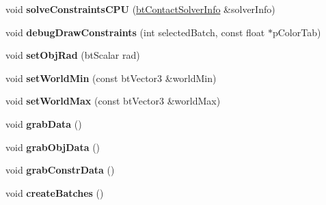 \begin{DoxyCompactItemize}
\item 
\hypertarget{classbt_cuda_demo_dynamics_world3_d_a84fa871068d7e73ffc571b9fa111b28d}{void {\bfseries solve\+Constraints\+C\+P\+U} (\hyperlink{structbt_contact_solver_info}{bt\+Contact\+Solver\+Info} \&solver\+Info)}\label{classbt_cuda_demo_dynamics_world3_d_a84fa871068d7e73ffc571b9fa111b28d}

\item 
\hypertarget{classbt_cuda_demo_dynamics_world3_d_a452fcd29c4582e80a683e573fe2eb6e0}{void {\bfseries debug\+Draw\+Constraints} (int selected\+Batch, const float $\ast$p\+Color\+Tab)}\label{classbt_cuda_demo_dynamics_world3_d_a452fcd29c4582e80a683e573fe2eb6e0}

\item 
\hypertarget{classbt_cuda_demo_dynamics_world3_d_a687eebcca42ddec28019d5b0d8bf0633}{void {\bfseries set\+Obj\+Rad} (bt\+Scalar rad)}\label{classbt_cuda_demo_dynamics_world3_d_a687eebcca42ddec28019d5b0d8bf0633}

\item 
\hypertarget{classbt_cuda_demo_dynamics_world3_d_a26c02058ac842cfb362cbda8eef0ddd2}{void {\bfseries set\+World\+Min} (const bt\+Vector3 \&world\+Min)}\label{classbt_cuda_demo_dynamics_world3_d_a26c02058ac842cfb362cbda8eef0ddd2}

\item 
\hypertarget{classbt_cuda_demo_dynamics_world3_d_a1e186d740baceb1ce45c19b056f5068a}{void {\bfseries set\+World\+Max} (const bt\+Vector3 \&world\+Max)}\label{classbt_cuda_demo_dynamics_world3_d_a1e186d740baceb1ce45c19b056f5068a}

\item 
\hypertarget{classbt_cuda_demo_dynamics_world3_d_a8ec7e1ea649da2436f7f0fabbe99eba5}{void {\bfseries grab\+Data} ()}\label{classbt_cuda_demo_dynamics_world3_d_a8ec7e1ea649da2436f7f0fabbe99eba5}

\item 
\hypertarget{classbt_cuda_demo_dynamics_world3_d_aa7dfa35a2b22167a8fa1bcfb1ea0feb4}{void {\bfseries grab\+Obj\+Data} ()}\label{classbt_cuda_demo_dynamics_world3_d_aa7dfa35a2b22167a8fa1bcfb1ea0feb4}

\item 
\hypertarget{classbt_cuda_demo_dynamics_world3_d_a324466e5527653dd18de0fdc081f654b}{void {\bfseries grab\+Constr\+Data} ()}\label{classbt_cuda_demo_dynamics_world3_d_a324466e5527653dd18de0fdc081f654b}

\item 
\hypertarget{classbt_cuda_demo_dynamics_world3_d_aaa760c81b9ceff7be4419a091c54f0d1}{void {\bfseries create\+Batches} ()}\label{classbt_cuda_demo_dynamics_world3_d_aaa760c81b9ceff7be4419a091c54f0d1}


\end{DoxyCompactItemize}
